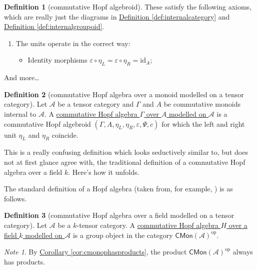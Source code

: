 \documentclass[a4paper,10pt]{scrreprt}
\newcommand{\defn}[1]{\ul{#1}}
\theoremstyle{definition}
\newtheorem{definition}{Definition}[section]
\theoremstyle{plain}
\theoremstyle{remark}
\newtheorem{note}{Note}[section]
\begin{document}
\begin{definition}[commutative Hopf algebroid]
  These satisfy the following axioms, which are really just the diagrams in \hyperref[def:internalcategory]{Definition \ref*{def:internalcategory}} and \hyperref[def:internalgroupoid]{Definition \ref*{def:internalgroupoid}}.
  \begin{enumerate}
    \item The units operate in the correct way:
      \begin{itemize}
        \item Identity morphisms $\varepsilon \circ \eta_{L} = \varepsilon \circ \eta_{R} = \mathrm{id}_{A}$;
      \end{itemize}
  \end{enumerate}
  And more\dots
\end{definition}

\begin{definition}[commutative Hopf algebra over a monoid modelled on a tensor category]
  \label{def:commutativehopfalgebraoveramonoidmodelledonatensorcategory}
  Let $\mathscr{A}$ be a tensor category and $\Gamma$ and $A$ be commutative monoids internal to $\mathscr{A}$. A \defn{commutative Hopf algebra $\Gamma$ over $A$ modelled on $\mathscr{A}$} is a commutative Hopf algebroid $(\Gamma, A, \eta_{L}, \eta_{R}, \varepsilon, \Psi, c)$ for which the left and right unit $\eta_{L}$ and $\eta_{R}$ coincide.
\end{definition}

This is a really confusing definition which looks seductively similar to, but does not at first glance agree with, the traditional definition of a commutative Hopf algebra over a field $k$. Here's how it unfolds.

The standard definition of a Hopf algebra (taken from, for example, \cite{milne-affine-group-schemes}) is as follows.

\begin{definition}[commutative Hopf algebra over a field modelled on a tensor category]
  \label{def:commutativehopfalgebraoverafieldmodelledonatensorcategory}
  Let $\mathscr{A}$ be a $k$-tensor category. A \defn{commutative Hopf algebra $H$ over a field $k$ modelled on $\mathscr{A}$} is a group object in the category $\mathsf{CMon}(\mathscr{A})^{\mathrm{op}}$.
\end{definition}

\begin{note}
  By \hyperref[cor:cmonophasproducts]{Corollary \ref*{cor:cmonophasproducts}}, the product $\mathsf{CMon}(\mathscr{A})^{\mathrm{op}}$ always has products.
\end{note}
\end{document}
